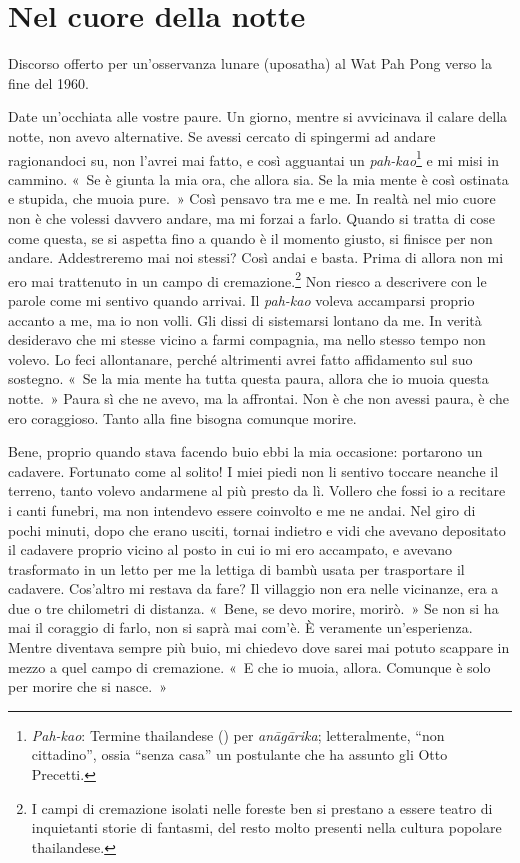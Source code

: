 \chapter{Nel cuore della notte}

\begin{openingQuote}
  Discorso offerto per un'osservanza lunare (uposatha) al Wat Pah Pong
  verso la fine del 1960.
\end{openingQuote}

Date un'occhiata alle vostre paure. Un giorno, mentre si avvicinava il
calare della notte, non avevo alternative. Se avessi cercato di
spingermi ad andare ragionandoci su, non l'avrei mai fatto, e così
agguantai un \emph{pah-kao}\footnote{\emph{Pah-kao}: Termine thailandese
  () per \emph{anāgārika}; letteralmente, ``non
  cittadino'', ossia ``senza casa'' un postulante che ha assunto gli
  Otto Precetti.} e mi misi in cammino. «~Se è giunta la mia ora, che
allora sia. Se la mia mente è così ostinata e stupida, che muoia pure.~»
Così pensavo tra me e me. In realtà nel mio cuore non è che volessi
davvero andare, ma mi forzai a farlo. Quando si tratta di cose come
questa, se si aspetta fino a quando è il momento giusto, si finisce per
non andare. Addestreremo mai noi stessi? Così andai e basta. Prima di
allora non mi ero mai trattenuto in un campo di cremazione.\footnote{I
  campi di cremazione isolati nelle foreste ben si prestano a essere
  teatro di inquietanti storie di fantasmi, del resto molto presenti
  nella cultura popolare thailandese.} Non riesco a descrivere con le
parole come mi sentivo quando arrivai. Il \emph{pah-kao} voleva
accamparsi proprio accanto a me, ma io non volli. Gli dissi di
sistemarsi lontano da me. In verità desideravo che mi stesse vicino a
farmi compagnia, ma nello stesso tempo non volevo. Lo feci allontanare,
perché altrimenti avrei fatto affidamento sul suo sostegno. «~Se la mia
mente ha tutta questa paura, allora che io muoia questa notte.~» Paura
sì che ne avevo, ma la affrontai. Non è che non avessi paura, è che ero
coraggioso. Tanto alla fine bisogna comunque morire.

Bene, proprio quando stava facendo buio ebbi la mia occasione: portarono
un cadavere. Fortunato come al solito! I miei piedi non li sentivo
toccare neanche il terreno, tanto volevo andarmene al più presto da lì.
Vollero che fossi io a recitare i canti funebri, ma non intendevo essere
coinvolto e me ne andai. Nel giro di pochi minuti, dopo che erano
usciti, tornai indietro e vidi che avevano depositato il cadavere
proprio vicino al posto in cui io mi ero accampato, e avevano
trasformato in un letto per me la lettiga di bambù usata per trasportare
il cadavere. Cos'altro mi restava da fare? Il villaggio non era nelle
vicinanze, era a due o tre chilometri di distanza. «~Bene, se devo
morire, morirò.~» Se non si ha mai il coraggio di farlo, non si saprà
mai com'è. È veramente un'esperienza. Mentre diventava sempre più buio,
mi chiedevo dove sarei mai potuto scappare in mezzo a quel campo di
cremazione. «~E che io muoia, allora. Comunque è solo per morire che si
nasce.~»

